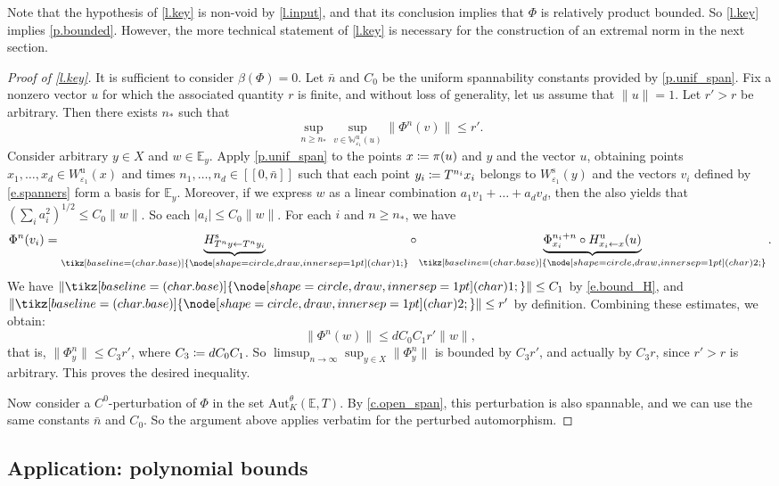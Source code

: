 \documentclass[10pt]{amsart}
\newcommand{\ldbrack}{[\![}
\newcommand{\rdbrack}{]\!]}
\def\vcentcolon{\mathrel{\mathop\ordinarycolon}}
\providecommand\ordinarycolon{:}
\providecommand*\coloneqq{\vcentcolon\mathrel{\mkern-1.2mu}=}
\theoremstyle{plain}
\theoremstyle{definition}
\newcommand{\EE}{\mathbb{E}}
\newcommand{\WW}{\mathbb{W}}
\newcommand*\circled[1]{\tikz[baseline=(char.base)]{
\node[shape=circle,draw,inner sep=1pt] (char) {\footnotesize{#1}};}}
\newcommand{\uu}{\mathrm{u}}
\renewcommand{\ss}{\mathrm{s}}
\newcommand{\Aut}{\mathrm{Aut}}
\let\epsilon\varepsilon
\begin{document}
Note that the hypothesis of \cref{l.key} is non-void by \cref{l.input}, and that its conclusion implies that $\Phi$ is relatively product bounded. So \cref{l.key} implies \cref{p.bounded}. However, the more technical statement of \cref{l.key} is necessary for the construction of an extremal norm in the next section.

\begin{proof}[Proof of \cref{l.key}]
It is sufficient to consider $\beta(\Phi)=0$.
Let $\bar{n}$ and $C_0$ be the uniform spannability constants provided by \cref{p.unif_span}.
Fix a nonzero vector $u$ for which the associated quantity $r$ is finite, and without loss of generality, let us assume that $\|u\| = 1$.
Let $r'>r$ be arbitrary.
Then there exists $n_*$ such that
\[
\sup_{n \ge n_*} \sup_{v \in \WW^\uu_{\epsilon_1}(u)} \|\Phi^n(v)\| \le r'.
\]
Consider arbitrary $y \in X$ and $w \in \EE_y$.
Apply \cref{p.unif_span} to the points $x \coloneqq \pi(u)$ and $y$ and the vector $u$, obtaining
points $x_1, \dots, x_d \in W^\uu_{\epsilon_1}(x)$ and times $n_1, \dots, n_d \in \ldbrack 0, \bar{n} \rdbrack$ such that each point $y_i \coloneqq T^{n_i} x_i$ belongs to $W^\ss_{\epsilon_1}(y)$ and the vectors $v_i$ defined by \eqref{e.spanners} form a basis for $\EE_y$.
Moreover, if we express $w$ as a linear combination $a_1 v_1 + \dots + a_d v_d$, then the  also yields that $(\sum_i a_i^2)^{1/2} \le C_0 \|w\|$. So each $|a_i| \le C_0\|w\|$.
For each $i$ and $n \ge n_*$,
we have
\[
\Phi^n(v_i) = \underbrace{H^\ss_{T^n y \gets T^n y_i}}_{\circled{1}} \circ \underbrace{\Phi^{n_i+n}_{x_i} \circ H^\uu_{x_i \gets x} (u)}_{\circled{2}}.
\]
We have $\| \circled{1} \| \le C_1$ by \eqref{e.bound_H}, and $\| \circled{2} \| \le r'$ by definition.
Combining these estimates, we obtain:
\[
\|\Phi^n(w) \| \le d C_0 C_1 r' \|w\|,
\]
that is, $\|\Phi^n_y\| \le C_3 r'$, where $C_3 \coloneqq d C_0 C_1$.
So $\limsup_{n \to \infty} \sup_{y \in X} \|\Phi^n_y \|$ is bounded by $C_3 r'$,
and actually by $C_3 r$, since $r'>r$ is arbitrary.
This proves the desired inequality.

Now consider a $C^0$-perturbation of $\Phi$ in the set $\Aut^\theta_K(\EE,T)$. By \cref{c.open_span}, this perturbation is also spannable, and we can use the same constants $\bar{n}$ and $C_0$.
So the argument above applies verbatim for the perturbed automorphism.
\end{proof}

\subsection{Application: polynomial bounds}\label{ss.polynomial}
\end{document}
